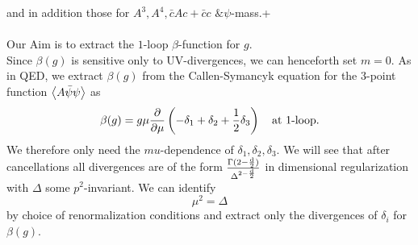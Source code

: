 and in addition those for $A^3,A^4, \bar{c} A c+\bar{c} c$ $\& \psi$-mass.+
\\
\\
Our Aim is to extract the $1$-loop $\beta$-function for $g$.\\
Since $\beta(g)$ is sensitive only to UV-divergences, we can henceforth set $m=0$. As in QED, we extract $\beta(g)$ from the Callen-Symancyk equation for the $3$-point function $\expval{A\bar{\psi} \psi}$ as
\begin{equation}
\beta(g) = g \mu \frac{\partial}{\partial \mu} \left(-\delta_1 + \delta_2 + \frac{1}{2} \delta_3\right) \quad \text{at $1$-loop}.
\end{equation}
We therefore only need the $mu$-dependence of $\delta_1,\delta_2,\delta_3$. We will see that after cancellations all divergences are of the form 
$\frac{\Gamma(2-\frac{\mathrm{d}}{2})}{\Delta^{2-\frac{\mathrm{d}}{2}} }$ in dimensional regularization with $\Delta$ some $p^2$-invariant. We can identify
\begin{equation}
	\mu^2 = \Delta
\end{equation}
by choice of renormalization conditions and extract only the divergences of $\delta_i$ for $\beta(g)$.



